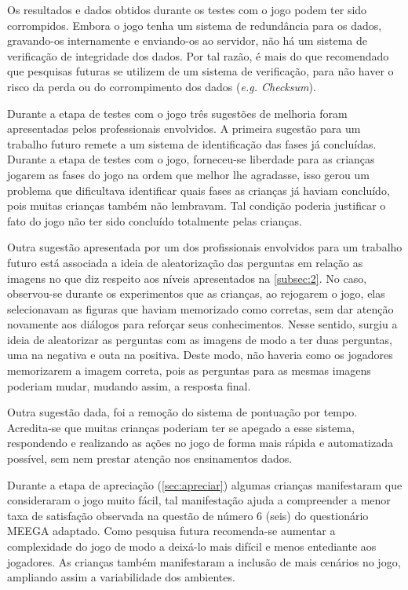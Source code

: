 Os resultados e dados obtidos durante os testes com o jogo podem ter sido corrompidos. Embora o jogo tenha um sistema de redundância para os dados, gravando-os internamente e enviando-os ao servidor, não há um sistema de verificação de integridade dos dados. Por tal razão, é mais do que recomendado que pesquisas futuras se utilizem de um sistema de verificação, para não haver o risco da perda ou do corrompimento dos dados (\textit{e.g. Checksum}).


Durante a etapa de testes com o jogo três sugestões de melhoria foram apresentadas pelos professionais envolvidos. A primeira sugestão para um trabalho futuro remete a um sistema de identificação das fases já concluídas. Durante a etapa de testes com o jogo, forneceu-se liberdade para as crianças jogarem as fases do jogo na ordem que melhor lhe agradasse, isso gerou um problema que dificultava identificar quais fases as crianças já haviam concluído, pois muitas crianças também não lembravam. Tal condição poderia justificar o fato do jogo não ter sido concluído totalmente pelas crianças. 

Outra sugestão apresentada por um dos profissionais envolvidos para um trabalho futuro está associada a ideia de aleatorização das perguntas em relação as imagens no que diz respeito aos níveis apresentados na \autoref{subsec:2}. No caso, observou-se durante os experimentos que as crianças, ao rejogarem o jogo, elas selecionavam as figuras que haviam memorizado como corretas, sem dar atenção novamente aos diálogos para reforçar seus conhecimentos. Nesse sentido, surgiu a ideia de aleatorizar as perguntas com as imagens de modo a ter duas perguntas, uma na negativa e outa na positiva. Deste modo, não haveria como os jogadores memorizarem a imagem correta, pois as perguntas para as mesmas imagens poderiam mudar, mudando assim, a resposta final. 

Outra sugestão dada, foi a remoção do sistema de pontuação por tempo. Acredita-se que muitas crianças poderiam ter se apegado a esse sistema, respondendo e realizando as ações no jogo de forma mais rápida e automatizada possível, sem nem prestar atenção nos ensinamentos dados. 

\newpage

Durante a etapa de apreciação (\autoref{sec:apreciar}) algumas crianças manifestaram que consideraram o jogo muito fácil, tal manifestação ajuda a compreender a menor taxa de satisfação observada na questão de número 6 (seis) do questionário \ac{MEEGA} adaptado. Como pesquisa futura recomenda-se aumentar a complexidade do jogo de modo a deixá-lo mais difícil e menos entediante aos jogadores. As crianças também manifestaram a inclusão de mais cenários no jogo, ampliando assim a variabilidade dos ambientes. 

